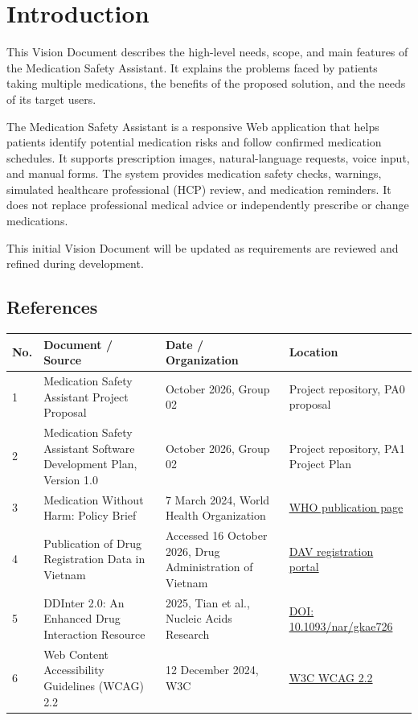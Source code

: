 
\section{Introduction}

This Vision Document describes the high-level needs,
scope, and main features of the Medication Safety Assistant.
It explains the problems faced by patients taking multiple
medications, the benefits of the proposed solution,
and the needs of its target users.

The Medication Safety Assistant is a responsive Web
application that helps patients identify potential
medication risks and follow confirmed medication
schedules. It supports prescription images, natural-language
requests, voice input, and manual forms. The system provides
medication safety checks, warnings, simulated healthcare
professional (HCP) review, and medication reminders.
It does not replace professional medical advice or
independently prescribe or change medications.

This initial Vision Document will be updated as
requirements are reviewed and refined during development.

\subsection{References}

\begin{longtable}{|L{0.06\textwidth}|L{0.34\textwidth}|L{0.20\textwidth}|L{0.30\textwidth}|}
\hline
\textbf{No.} & \textbf{Document / Source} &
\textbf{Date / Organization} & \textbf{Location}\\ \hline

1 & Medication Safety Assistant Project Proposal
& October 2026, Group 02
& Project repository, PA0 proposal
\\ \hline

2 & Medication Safety Assistant Software Development Plan,
Version 1.0
& October 2026, Group 02
& Project repository, PA1 Project Plan
\\ \hline

3 & Medication Without Harm: Policy Brief
& 7 March 2024, World Health Organization
& \href{https://www.who.int/publications/i/item/9789240062764}
{WHO publication page}
\\ \hline

4 & Publication of Drug Registration Data in Vietnam
& Accessed 16 October 2026,
Drug Administration of Vietnam
& \href{https://dichvucong.dav.gov.vn/congbothuoc/index}
{DAV registration portal}
\\ \hline

5 & DDInter 2.0: An Enhanced Drug Interaction Resource
& 2025, Tian et al.,
Nucleic Acids Research
& \href{https://doi.org/10.1093/nar/gkae726}
{DOI: 10.1093/nar/gkae726}
\\ \hline

6 & Web Content Accessibility Guidelines (WCAG) 2.2
& 12 December 2024, W3C
& \href{https://www.w3.org/TR/WCAG22/}
{W3C WCAG 2.2}
\\ \hline

\end{longtable}
